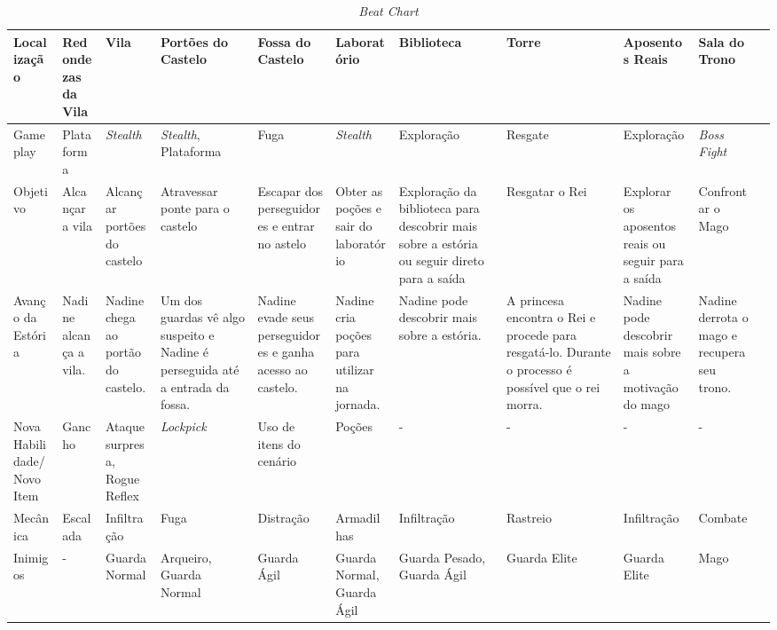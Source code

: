 \begin{landscape}
	\hspace{-4cm}
	\begin{center}	
		\begin{table}[H]
			\label{bchart}
			\center
			\raggedbottom
		  	\begin{tabular}{| m{1.8cm} | m{1.8cm} | m{1.5cm} | m{1.5cm} | m{1.8cm}| m{1.8cm} | m{1.5cm} | m{1.5cm} | m{1.5cm} | m{1.5cm}| m{1.5cm}}
		  
		  	\hline
		  
			Localização & Redondezas da Vila  & Vila & Portões do Castelo & Fossa do Castelo & Laboratório & Biblioteca & Torre & Aposentos Reais & Sala do Trono\\ \hline
		
			Gameplay & Plataforma & \emph{Stealth} & \emph{Stealth}, Plataforma & Fuga & \emph{Stealth} & Exploração & Resgate & Exploração & \emph{Boss Fight}\\ \hline
		
			Objetivo  & Alcançar a vila & Alcançar portões do castelo & Atravessar ponte para o castelo & Escapar dos perseguidores e entrar no astelo & Obter as poções e sair do laboratório & Exploração da biblioteca para descobrir mais sobre a estória ou seguir direto para a saída & Resgatar o Rei & Explorar os aposentos reais ou seguir para a saída & Confrontar o Mago \\ \hline
		
			Avanço da Estória & Nadine alcança a vila. & Nadine chega ao portão do castelo. & Um dos guardas vê algo suspeito e Nadine é perseguida até a entrada da fossa. & Nadine evade seus perseguidores e ganha acesso ao castelo. & Nadine cria poções para utilizar na jornada. & Nadine pode descobrir mais sobre a estória. & A princesa encontra o Rei e procede para resgatá-lo. Durante o processo é possível que o rei morra. &  Nadine pode descobrir mais sobre a motivação do mago & Nadine derrota o mago e recupera seu trono. \\ \hline
		
			Nova Habilidade/Novo Item & Gancho & Ataque surpresa, Rogue Reflex	& \emph{Lockpick} & Uso de itens do cenário & Poções & - & - & - & -  \\ \hline
		
			Mecânica & Escalada & Infiltração & Fuga & Distração & Armadilhas & Infiltração & Rastreio & Infiltração & Combate \\ \hline
		
			Inimigos & - & Guarda Normal & Arqueiro, Guarda Normal & Guarda Ágil & Guarda Normal, Guarda Ágil & Guarda Pesado, Guarda Ágil & Guarda Elite & Guarda Elite & Mago \\ \hline
			
		  \end{tabular}

			\caption{\emph{Beat Chart}}
	
		\end{table}
	
	\end{center}
\end{landscape}

